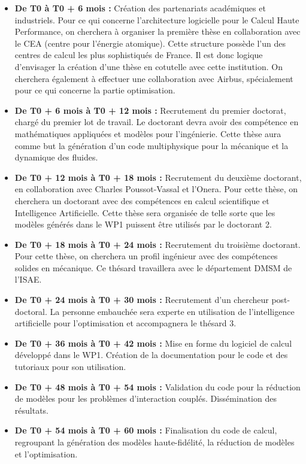 \documentclass[12pt, french]{article}
\begin{document}
\begin{itemize}
	\item \textbf{De T0 à T0 + 6 mois :} Création des partenariats académiques et industriels.
	Pour ce qui concerne l'architecture logicielle pour le Calcul Haute Performance, on cherchera à organiser la première thèse en collaboration avec le CEA (centre pour l'énergie atomique). Cette structure possède l'un des centres de calcul les plus sophistiqués de France. Il est donc logique d'envisager la création d'une thèse en cotutelle avec cette institution. On cherchera également à effectuer une collaboration avec Airbus, spécialement pour ce qui concerne la partie optimisation.
	\item \textbf{De T0 + 6 mois à T0 + 12 mois : } Recrutement du premier doctorat, chargé du premier lot de travail. Le doctorant devra avoir des compétence en mathématiques appliquées et modèles pour l'ingénierie. Cette thèse aura comme but la génération d'un code multiphysique pour la mécanique et la dynamique des fluides.
	\item \textbf{De T0 + 12 mois à T0 + 18 mois : } Recrutement du deuxième doctorant, en collaboration avec Charles Poussot-Vassal et l'Onera. Pour cette thèse, on cherchera un doctorant avec des compétences en calcul scientifique et Intelligence Artificielle. Cette thèse sera organisée de telle sorte que les modèles générés dans le WP1 puissent être utilisés par le doctorant 2.
	\item \textbf{De T0 + 18 mois à T0 + 24 mois : } Recrutement du troisième doctorant. Pour cette thèse, on cherchera un profil ingénieur avec des compétences solides en mécanique. Ce thésard travaillera avec le département DMSM de l'ISAE.
	\item \textbf{De T0 + 24 mois à T0 + 30 mois : } Recrutement d'un chercheur post-doctoral. La personne embauchée sera experte en utilisation de l'intelligence artificielle pour l'optimisation et accompagnera le thésard 3. 
	\item \textbf{De T0 + 36 mois à T0 + 42 mois : } Mise en forme du logiciel de calcul développé dans le WP1. Création de la documentation pour le code et des tutoriaux pour son utilisation.
	\item \textbf{De T0 + 48 mois à T0 + 54 mois : } Validation du code pour la réduction de modèles pour les problèmes d'interaction couplés. Dissémination des résultats.
	\item \textbf{De T0 + 54 mois à T0 + 60 mois : } Finalisation du code de calcul, regroupant la génération des modèles haute-fidélité, la réduction de modèles et l'optimisation. 
\end{itemize} 
\end{document}
